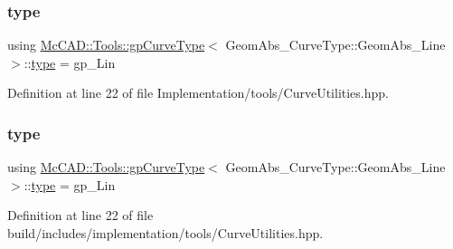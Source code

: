 \subsubsection{\texorpdfstring{type}{type}\hspace{0.1cm}{\footnotesize\ttfamily [1/2]}}
{\footnotesize\ttfamily using \hyperlink{structMcCAD_1_1Tools_1_1gpCurveType}{Mc\+C\+A\+D\+::\+Tools\+::gp\+Curve\+Type}$<$ Geom\+Abs\+\_\+\+Curve\+Type\+::\+Geom\+Abs\+\_\+\+Line $>$\+::\hyperlink{structMcCAD_1_1Tools_1_1gpCurveType_3_01GeomAbs__CurveType_1_1GeomAbs__Line_01_4_a5a405282c134eac447eea3fd3e9278e6}{type} =  gp\+\_\+\+Lin}



Definition at line 22 of file Implementation/tools/\+Curve\+Utilities.\+hpp.

\mbox{\label{structMcCAD_1_1Tools_1_1gpCurveType_3_01GeomAbs__CurveType_1_1GeomAbs__Line_01_4_a5a405282c134eac447eea3fd3e9278e6}} 
\subsubsection{\texorpdfstring{type}{type}\hspace{0.1cm}{\footnotesize\ttfamily [2/2]}}
{\footnotesize\ttfamily using \hyperlink{structMcCAD_1_1Tools_1_1gpCurveType}{Mc\+C\+A\+D\+::\+Tools\+::gp\+Curve\+Type}$<$ Geom\+Abs\+\_\+\+Curve\+Type\+::\+Geom\+Abs\+\_\+\+Line $>$\+::\hyperlink{structMcCAD_1_1Tools_1_1gpCurveType_3_01GeomAbs__CurveType_1_1GeomAbs__Line_01_4_a5a405282c134eac447eea3fd3e9278e6}{type} =  gp\+\_\+\+Lin}



Definition at line 22 of file build/includes/implementation/tools/\+Curve\+Utilities.\+hpp.



